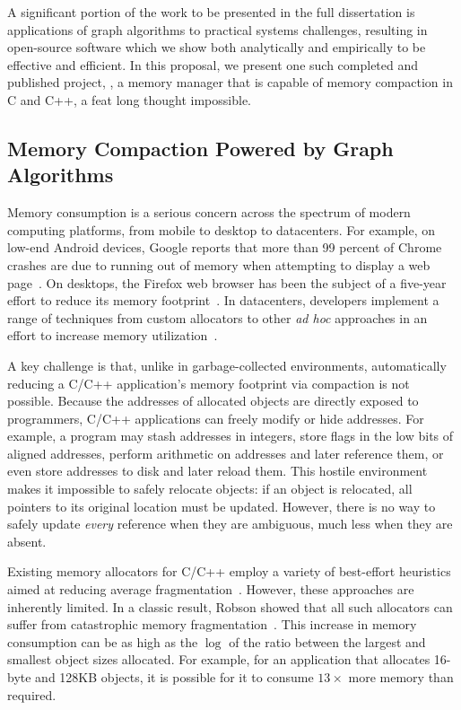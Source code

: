 A significant portion of the work to be presented in the full dissertation is applications of graph algorithms to practical systems challenges, resulting in open-source software which we show both analytically and empirically to be effective and efficient.  In this proposal, we present one such completed and published project, \Mesh, a memory manager that is capable of memory compaction in C and C++, a feat long thought impossible.

\subsection{Memory Compaction Powered by Graph Algorithms}
Memory consumption is a serious concern across the spectrum of modern
computing platforms, from mobile to desktop to datacenters. For
example, on low-end Android devices, Google reports that more than 99
percent of Chrome crashes are due to running out of memory when
attempting to display a web page~\cite{hara:stateofblink}. On
desktops, the Firefox web browser has been the subject of a five-year
effort to reduce its memory footprint~\cite{awsy}. In datacenters,
developers implement a range of techniques from custom allocators to
other \emph{ad hoc} approaches in an effort to increase memory
utilization~\cite{jemalloc:exposehints,redis:announcement}.


A key challenge is that, unlike in garbage-collected environments,
automatically reducing a C/C++ application's memory footprint
via compaction is not possible. Because the addresses of allocated
objects are directly exposed to programmers, C/C++ applications can
freely modify or hide addresses.  For example, a program may stash
addresses in integers, store flags in the low bits of aligned
addresses, perform arithmetic on addresses and later reference them,
or even store addresses to disk and later reload them.  This hostile
environment makes it impossible to safely relocate objects: if an
object is relocated, all pointers to its original location must be
updated. However, there is no way to safely update \emph{every}
reference when they are ambiguous, much less when they are absent.

Existing memory allocators for C/C++ employ a variety of
best-effort heuristics aimed at reducing average
fragmentation~\cite{johnstone:1998:fragmentation}. However, these
approaches are inherently limited. In a classic result, Robson showed
that all such allocators can suffer from catastrophic
memory fragmentation~\cite{robson:1977:worstcasefrag}. This increase
in memory consumption can be as high as the $\log$ of the ratio
between the largest and smallest object sizes allocated. For example,
for an application that allocates 16-byte and 128KB objects, it is
possible for it to consume $13\times$ more memory than required.


